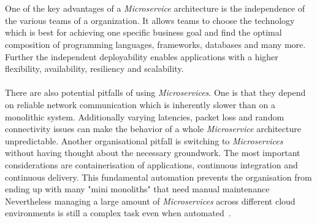 \\
\\
One of the key advantages of a \textit{Microservice} architecture is the independence of the various teams of a organization.
It allows teams to choose the technology which is best for achieving one specific business goal and find the optimal composition of programming languages, frameworks, databases and many more.
Further the independent deployability enables applications with a higher flexibility, availability, resiliency and scalability.
\\
\\
There are also potential pitfalls of using \textit{Microservices}.
One is that they depend on reliable network communication which is inherently slower than on a monolithic system.
Additionally varying latencies, packet loss and random connectivity issues can make the behavior of a whole \textit{Microservice} architecture unpredictable.
Another organisational pitfall is switching to \textit{Microservices} without having thought about the necessary groundwork.
The most important considerations are containerisation of applications, continuous integration and continuous delivery.
This fundamental automation prevents the organisation from ending up with many "mini monoliths" that need manual maintenance
Nevertheless managing a large amount of \textit{Microservices} across different cloud environments is still a complex task even when automated~\cite{Microservices1, Microservices2}.

